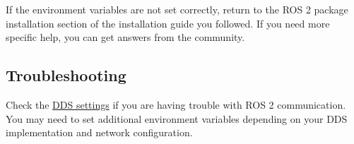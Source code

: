 If the environment variables are not set correctly, return to the ROS 2 package installation section of the installation guide you followed. If you need more specific help, you can get answers from the community.

\subsection{Troubleshooting}

Check the \href{https://docs.ros.org/en/humble/How-To-Guides/DDS-tuning.html}{DDS settings} if you are having trouble with ROS 2 communication. You may need to set additional environment variables depending on your DDS implementation and network configuration.

